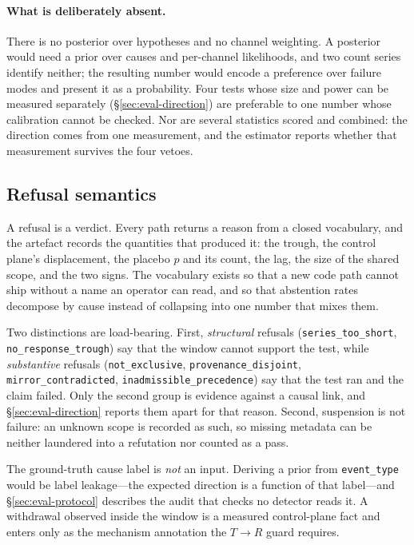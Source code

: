 \paragraph{What is deliberately absent.} There is no posterior over
hypotheses and no channel weighting. A posterior would need a prior over
causes and per-channel likelihoods, and two count series identify neither;
the resulting number would encode a preference over failure modes and
present it as a probability. Four tests whose size and power can be
measured separately (\S\ref{sec:eval-direction}) are preferable to one
number whose calibration cannot be checked. Nor are several statistics
scored and combined: the direction comes from one measurement, and the
estimator reports whether that measurement survives the four vetoes.

\subsection{Refusal semantics}
\label{sec:method-gate}

A refusal is a verdict. Every path returns a reason from a closed
vocabulary, and the artefact records the quantities that produced it: the
trough, the control plane's displacement, the placebo $p$ and its count,
the lag, the size of the shared scope, and the two signs. The vocabulary
exists so that a new code path cannot ship without a name an operator can
read, and so that abstention rates decompose by cause instead of collapsing
into one number that mixes them.

Two distinctions are load-bearing. First, \emph{structural} refusals
(\texttt{series\_too\_short}, \texttt{no\_response\_trough}) say that the
window cannot support the test, while \emph{substantive} refusals
(\texttt{not\_exclusive}, \texttt{provenance\_disjoint},
\texttt{mirror\_contradicted}, \texttt{inadmissible\_precedence}) say that
the test ran and the claim failed. Only the second group is evidence
against a causal link, and \S\ref{sec:eval-direction} reports them apart for
that reason. Second, suspension is not failure: an unknown scope is
recorded as such, so missing metadata can be neither laundered into a
refutation nor counted as a pass.

The ground-truth cause label is \emph{not} an input. Deriving a prior from
\texttt{event\_type} would be label leakage---the expected direction is a
function of that label---and \S\ref{sec:eval-protocol} describes the audit
that checks no detector reads it. A withdrawal observed inside the window
is a measured control-plane fact and enters only as the mechanism
annotation the $T\to R$ guard requires.

